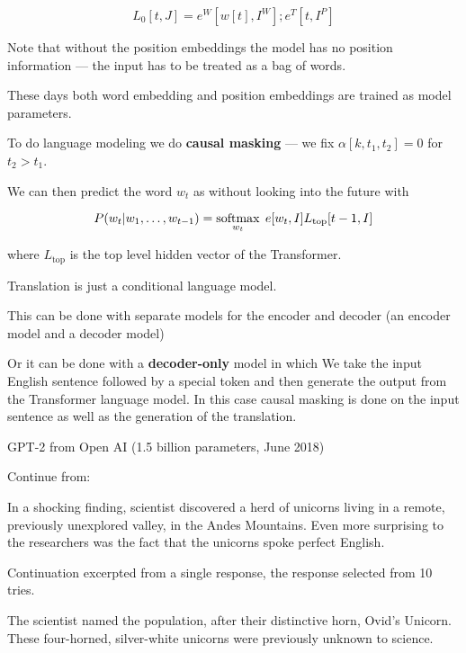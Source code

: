 {\vfill
{\color{red} $$L_0[t,J] = e^W[w[t],I^W];e^T[t,I^P]$$}

\vfill
Note that without the position embeddings the model has no position information --- the input has to be treated as a bag of words.

\vfill
These days both word embedding and position embeddings are trained as model parameters.


To do language modeling we do {\bf causal masking} --- we fix $\alpha[k,t_1,t_2] = 0$ for $t_2 > t_1$.

\vfill
We can then predict the word $w_t$ as without looking into the future with

\vfill
$$P(w_t|w_1,\ldots,w_{t-1}) = \operatorname*{softmax}_{w_t}\;e[w_t,I]L_\mathrm{top}[t-1,I]$$

\vfill
where $L_\mathrm{top}$ is the top level hidden vector of the Transformer.


Translation is just a conditional language model.

\vfill
This can be done with separate models for the encoder and decoder (an encoder model and a decoder model)

\vfill
Or it can be done with a {\bf decoder-only} model in which We take the input English sentence followed by a special token and then generate the output from the Transformer  language model.
In this case causal masking is done on the input sentence as well as the generation of the translation.



GPT-2 from Open AI (1.5 billion parameters, June 2018)

\vfill
{\color{red} Continue from:}

\vfill
In a shocking finding, scientist discovered a herd of unicorns living in a remote, previously unexplored valley, in the Andes Mountains. Even more surprising to the researchers was the fact that the unicorns spoke perfect English.


{\color{red} Continuation excerpted from a single response, the response selected from 10 tries.}

\bigskip

The scientist named the population, after their distinctive horn, Ovid’s Unicorn. These four-horned, silver-white unicorns were previously unknown to science.

}
